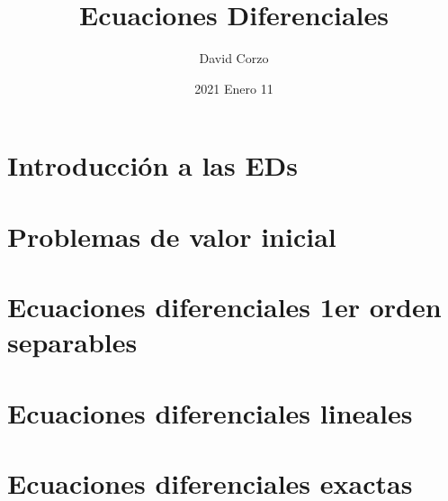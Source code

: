 \documentclass[openany]{book}
\title{Ecuaciones Diferenciales}
\date{2021 Enero 11} %
\author{David Corzo}
\begin{document}
\maketitle
\tableofcontents

\chapter{Introducción a las EDs}


\chapter{Problemas de valor inicial}


\chapter{Ecuaciones diferenciales 1er orden separables}


\chapter{Ecuaciones diferenciales lineales}


\chapter{Ecuaciones diferenciales exactas}


\end{document}
